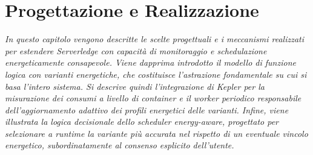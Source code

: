\chapter{Progettazione e Realizzazione}
\label{cap:ProgettazioneRealizzazione}

\emph{In questo capitolo vengono descritte le scelte progettuali e i meccanismi 
realizzati per estendere Serverledge con capacità di monitoraggio e 
schedulazione energeticamente consapevole. Viene dapprima introdotto il 
modello di funzione logica con varianti energetiche, che costituisce 
l'astrazione fondamentale su cui si basa l'intero sistema. Si descrive 
quindi l'integrazione di Kepler per la misurazione dei consumi a livello 
di container e il worker periodico responsabile dell'aggiornamento adattivo 
dei profili energetici delle varianti. Infine, viene illustrata la logica 
decisionale dello scheduler energy-aware, progettato per selezionare a 
runtime la variante più accurata nel rispetto di un eventuale vincolo 
energetico, subordinatamente al consenso esplicito dell'utente.}


%




